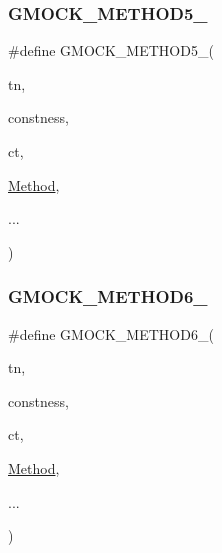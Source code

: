 \mbox{\label{_obj__test_2lib_2googletest-master_2googlemock_2include_2gmock_2gmock-generated-function-mockers_8h_a9e3ecd392499ab19a4a6d3adcabf56f6}} 
\subsubsection{\texorpdfstring{GMOCK\_METHOD5\_}{GMOCK\_METHOD5\_}}
{\footnotesize\ttfamily \#define G\+M\+O\+C\+K\+\_\+\+M\+E\+T\+H\+O\+D5\+\_\+(\begin{DoxyParamCaption}\item[{}]{tn,  }\item[{}]{constness,  }\item[{}]{ct,  }\item[{}]{\mbox{\hyperlink{_obj__test_2lib_2googletest-release-1_88_81_2googlemock_2test_2gmock-spec-builders__test_8cc_a95606368148f3e5aab5db46c32466afd}{Method}},  }\item[{}]{... }\end{DoxyParamCaption})}

\mbox{\label{_obj__test_2lib_2googletest-master_2googlemock_2include_2gmock_2gmock-generated-function-mockers_8h_ad0ca7f6973a076d0af4c953f8ed91842}} 
\subsubsection{\texorpdfstring{GMOCK\_METHOD6\_}{GMOCK\_METHOD6\_}}
{\footnotesize\ttfamily \#define G\+M\+O\+C\+K\+\_\+\+M\+E\+T\+H\+O\+D6\+\_\+(\begin{DoxyParamCaption}\item[{}]{tn,  }\item[{}]{constness,  }\item[{}]{ct,  }\item[{}]{\mbox{\hyperlink{_obj__test_2lib_2googletest-release-1_88_81_2googlemock_2test_2gmock-spec-builders__test_8cc_a95606368148f3e5aab5db46c32466afd}{Method}},  }\item[{}]{... }\end{DoxyParamCaption})}

